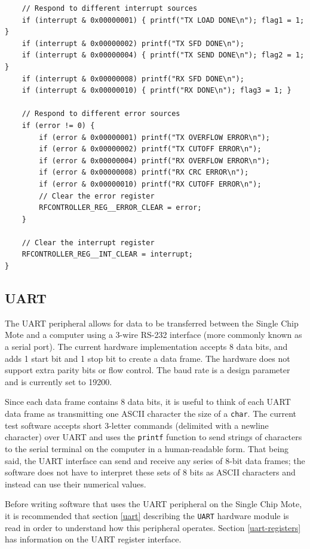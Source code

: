 \begin{lstlisting}
    // Respond to different interrupt sources
    if (interrupt & 0x00000001) { printf("TX LOAD DONE\n"); flag1 = 1; }
    if (interrupt & 0x00000002) printf("TX SFD DONE\n");
    if (interrupt & 0x00000004) { printf("TX SEND DONE\n"); flag2 = 1; }
    if (interrupt & 0x00000008) printf("RX SFD DONE\n");
    if (interrupt & 0x00000010) { printf("RX DONE\n"); flag3 = 1; }

    // Respond to different error sources
    if (error != 0) {
        if (error & 0x00000001) printf("TX OVERFLOW ERROR\n");
        if (error & 0x00000002) printf("TX CUTOFF ERROR\n");
        if (error & 0x00000004) printf("RX OVERFLOW ERROR\n");
        if (error & 0x00000008) printf("RX CRC ERROR\n");
        if (error & 0x00000010) printf("RX CUTOFF ERROR\n");
        // Clear the error register
        RFCONTROLLER_REG__ERROR_CLEAR = error;
    }
    
    // Clear the interrupt register
    RFCONTROLLER_REG__INT_CLEAR = interrupt;
}
\end{lstlisting}

\subsection{UART}
The UART peripheral allows for data to be transferred between the Single Chip Mote and a computer using a 3-wire RS-232 interface (more commonly known as a serial port). The current hardware implementation accepts 8 data bits, and adds 1 start bit and 1 stop bit to create a data frame. The hardware does not support extra parity bits or flow control. The baud rate is a design parameter and is currently set to 19200.

Since each data frame contains 8 data bits, it is useful to think of each UART data frame as transmitting one ASCII character the size of a \texttt{char}. The current test software accepts short 3-letter commands (delimited with a newline character) over UART and uses the \texttt{printf} function to send strings of characters to the serial terminal on the computer in a human-readable form. That being said, the UART interface can send and receive any series of 8-bit data frames; the software does not have to interpret these sets of 8 bits as ASCII characters and instead can use their numerical values.

Before writing software that uses the UART peripheral on the Single Chip Mote, it is recommended that section \ref{uart} describing the \texttt{UART} hardware module is read in order to understand how this peripheral operates. Section \ref{uart-registers} has information on the UART register interface.

